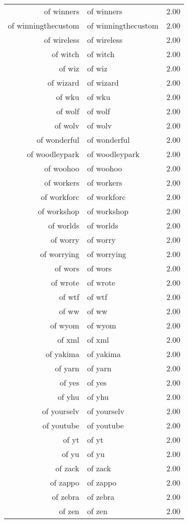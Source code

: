 \begin{table}[ht]
\begin{tabular}{rlr}
  of winners & of winners & 2.00 \\ 
  of winningthecustom & of winningthecustom & 2.00 \\ 
  of wireless & of wireless & 2.00 \\ 
  of witch & of witch & 2.00 \\ 
  of wiz & of wiz & 2.00 \\ 
  of wizard & of wizard & 2.00 \\ 
  of wku & of wku & 2.00 \\ 
  of wolf & of wolf & 2.00 \\ 
  of wolv & of wolv & 2.00 \\ 
  of wonderful & of wonderful & 2.00 \\ 
  of woodleypark & of woodleypark & 2.00 \\ 
  of woohoo & of woohoo & 2.00 \\ 
  of workers & of workers & 2.00 \\ 
  of workforc & of workforc & 2.00 \\ 
  of workshop & of workshop & 2.00 \\ 
  of worlds & of worlds & 2.00 \\ 
  of worry & of worry & 2.00 \\ 
  of worrying & of worrying & 2.00 \\ 
  of wors & of wors & 2.00 \\ 
  of wrote & of wrote & 2.00 \\ 
  of wtf & of wtf & 2.00 \\ 
  of ww & of ww & 2.00 \\ 
  of wyom & of wyom & 2.00 \\ 
  of xml & of xml & 2.00 \\ 
  of yakima & of yakima & 2.00 \\ 
  of yarn & of yarn & 2.00 \\ 
  of yes & of yes & 2.00 \\ 
  of yhu & of yhu & 2.00 \\ 
  of yourselv & of yourselv & 2.00 \\ 
  of youtube & of youtube & 2.00 \\ 
  of yt & of yt & 2.00 \\ 
  of yu & of yu & 2.00 \\ 
  of zack & of zack & 2.00 \\ 
  of zappo & of zappo & 2.00 \\ 
  of zebra & of zebra & 2.00 \\ 
  of zen & of zen & 2.00 \\ 

\end{tabular}
\end{table}
